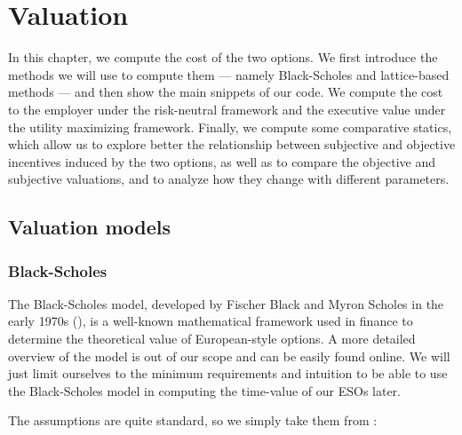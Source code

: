 \section{Valuation}

    In this chapter, we compute the cost of the two options. We first introduce the methods we will use to compute them --- namely Black-Scholes and lattice-based methods --- and then show the main snippets of our code. We compute the cost to the employer under the risk-neutral framework and the executive value under the utility maximizing framework. Finally, we compute some comparative statics, which allow us to explore better the relationship between subjective and objective incentives induced by the two options, as well as to compare the objective and subjective valuations, and to analyze how they change with different parameters.






\subsection{Valuation models} 

\subsubsection*{Black-Scholes}
    The Black-Scholes model, developed by Fischer Black and Myron Scholes in the early 1970s (\cite{black1973pricing}), is a well-known mathematical framework used in finance to determine the theoretical value of European-style options. A more detailed overview of the model is out of our scope and can be easily found online. We will just limit ourselves to the minimum requirements and intuition to be able to use the Black-Scholes model in computing the time-value of our ESOs later.
    
    The assumptions are quite standard, so we simply take them from \cite{wiki:blackscholes}:


